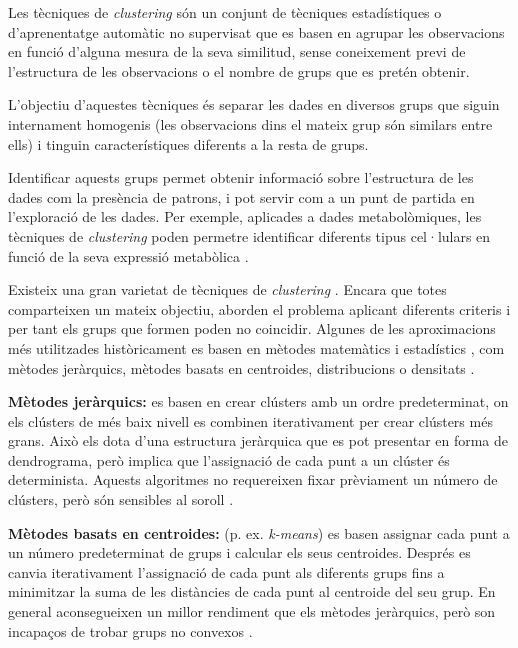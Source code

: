 \documentclass[CAT,BIB]{TFUOC}%
\begin{document}
        Les tècniques de \textit{clustering} són un conjunt de tècniques estadístiques o d'aprenentatge automàtic no supervisat que es basen en agrupar les observacions en funció d'alguna mesura de la seva similitud, sense coneixement previ de l'estructura de les observacions o el nombre de grups que es pretén obtenir.

        L'objectiu d'aquestes tècniques és separar les dades en diversos grups que siguin internament homogenis (les observacions dins el mateix grup són similars entre ells) i tinguin característiques diferents a la resta de grups.

        Identificar aquests grups permet obtenir informació sobre l'estructura de les dades com la presència de patrons, i pot servir com a un punt de partida en l'exploració de les dades. Per exemple, aplicades a dades metabolòmiques, les tècniques de \textit{clustering} poden permetre identificar diferents tipus cel·lulars en funció de la seva expressió metabòlica \citep{Blekherman2011}.

        Existeix una gran varietat de tècniques de \textit{clustering} \citep{Karim2021, Min2018, Blekherman2011, Masood2015}. Encara que totes comparteixen un mateix objectiu, aborden el problema aplicant diferents criteris i per tant els grups que formen poden no coincidir. Algunes de les aproximacions més utilitzades històricament es basen en mètodes matemàtics i estadístics \citep{Masood2015}, com mètodes jeràrquics, mètodes basats en centroides, distribucions o densitats \citep{Karim2021}.

        \textbf{Mètodes jeràrquics:} es basen en crear clústers amb un ordre predeterminat, on els clústers de més baix nivell es combinen iterativament per crear clústers més grans. Això els dota d'una estructura jeràrquica que es pot presentar en forma de dendrograma, però implica que l'assignació de cada punt a un clúster és determinista. Aquests algoritmes no requereixen fixar prèviament un número de clústers, però són sensibles al soroll \citep{Karim2021}.

        \textbf{Mètodes basats en centroides:} (p. ex. \textit{k-means}) es basen assignar cada punt a un número predeterminat de grups i calcular els seus centroides. Després es canvia iterativament l'assignació de cada punt als diferents grups fins a minimitzar la suma de les distàncies de cada punt al centroide del seu grup. En general aconsegueixen un millor rendiment que els mètodes jeràrquics, però son incapaços de trobar grups no convexos \citep{Karim2021}.
\end{document}
